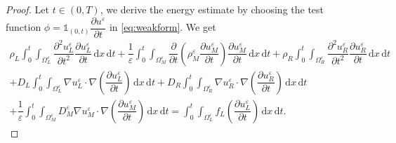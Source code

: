 \documentclass[11pt]{article}
\def\es{\varepsilon}
\def\orr{\Omega_R^\varepsilon}
\def\omm{\Omega_M^\varepsilon}
\def\oll{\Omega_L^\varepsilon}
\newcommand{\di}[1]{\,\mathrm{d}#1}
\begin{document}
	\begin{proof}
	Let $t\in(0,T)$, we derive the energy estimate by choosing the test function $\phi= \mathds{1}_{(0,t)}\dfrac{\partial u^\es}{\partial t}$ in \eqref{eq:weakform}. We get
	\begin{multline*}
    \rho_L\int_0^t\int_{\oll}  \dfrac{\partial^2u_L^\es}{\partial t^2}  \dfrac{\partial u_L^\es}{\partial t}\di{x}\di{t}+  \dfrac{1}{\es}\int_0^t\int_{\omm} \dfrac{\partial }{\partial t}\left(\rho_M^\es \dfrac{\partial u_M^\es}{\partial t}\right)  \dfrac{\partial u_M^\es}{\partial t}\di{x}\di{t}+\rho_R \int_0^t\int_{\orr}  \dfrac{\partial^2u_R^\es}{\partial t^2}  \dfrac{\partial u_R^\es}{\partial t}\di{x}\di{t}\\
    +D_L\int_0^t\int_{\oll}\nabla u_L^\es\cdot \nabla  \left(\dfrac{\partial u_L^\es}{\partial t} \right) \di{x} \di{t}
    + D_R\int_0^t\int_{\orr} \nabla u_R^\es\cdot\nabla \left(\dfrac{\partial u_R^\es}{\partial t} \right) \di{x} \di{t}
   \\ + \dfrac{1}{\es}\int_0^t\int_{\omm}  D_M^\es  \nabla u_M^\es\cdot\nabla \left(\dfrac{\partial u_M^\es}{\partial t} \right) \di{x}\di{t} = \int_0^t\int_{\oll} f_L\left(\dfrac{\partial u_L^\es}{\partial t} \right) \di{x}\di{t}.
\end{multline*}




\end{proof}
\end{document}
